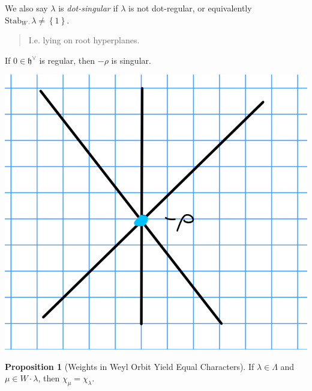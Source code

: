 \documentclass[11pt]{scrartcl}
\theoremstyle{definition}
\theoremstyle{theorem}
\newtheorem{proposition}[theorem]{Proposition}
\theoremstyle{proof}
\theoremstyle{definition}
\theoremstyle{break}
\theoremstyle{problem}
\providecommand{\tightlist}{%
  \setlength{\itemsep}{0pt}\setlength{\parskip}{0pt}}
\newcommand{\dual}[0]{^\vee}
\newcommand{\lieh}[0]{{\mathfrak{h}}}
\newcommand{\stab}[0]{{\mathrm{Stab}}}
\newcommand{\theset}[1]{\left\{{#1}\right\}}
\begin{document}
We also say \(\lambda\) is \emph{dot-singular} if \(\lambda\) is not
dot-regular, or equivalently \(\stab_{W\cdot}\lambda \neq \theset{1}\).

\begin{quote}
I.e. lying on root hyperplanes.
\end{quote}

\begin{description}
\tightlist
\item[Exercise]
If \(0\in \lieh\dual\) is regular, then \(-\rho\) is singular.
\end{description}

\includegraphics{figures/2020-02-05-09:26.png}\\

\begin{proposition}[Weights in Weyl Orbit Yield Equal Characters]

If \(\lambda \in \Lambda\) and \(\mu \in W\cdot \lambda\), then
\(\chi_\mu = \chi_\lambda\).\end{proposition}
\end{document}
